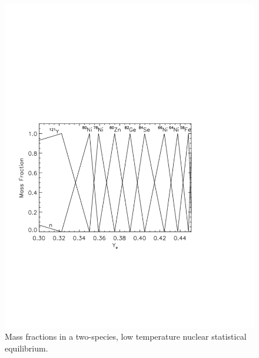 \documentclass{article}    %
\begin{document}
\begin{figure}[htp]
\centering
\includegraphics[width=5in]{figures/lower}
\caption{Mass fractions in a two-species, low temperature nuclear
  statistical equilibrium.}
\label{fig:lower}
\end{figure}
\end{document}
